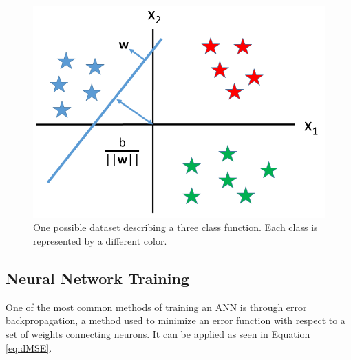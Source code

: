 
\begin{figure}[H]
	\centering
	\includegraphics[width=0.65\linewidth]{images/training_set_for_single_layer_hyperplane_v2}
	\caption{One possible dataset describing a three class function. Each class is represented by a different color.}
	\label{fig:training_set_one_layer}
\end{figure}

\subsection{Neural Network Training}

One of the most common methods of training an ANN is through error backpropagation, a method used to minimize an error function with respect to a set of weights connecting neurons. It can be applied as seen in Equation \ref{eq:dMSE}. %

